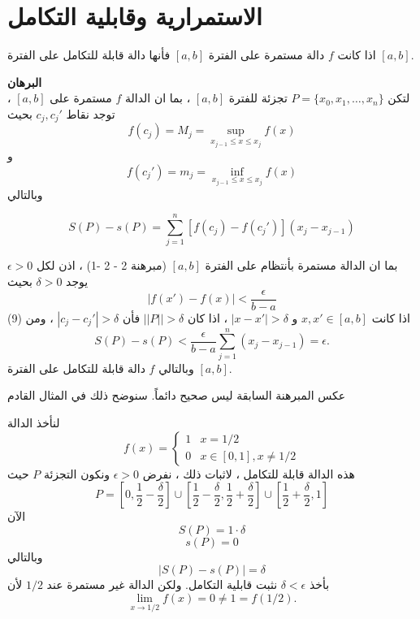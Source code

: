 \section{الاستمرارية وقابلية التكامل \cite{introrealanal}}

\begin{theorem}
	اذا كانت $f$ دالة مستمرة على الفترة $[a, b]$ فأنها دالة قابلة للتكامل على الفترة $[a, b]$.
\end{theorem}
\noindent
\textbf{البرهان}\\
\noindent
لتكن $P = \{ x_0 , x_1, \dots, x_n\}$ تجزئة للفترة $[a, b]$ ، بما ان الدالة $f$ مستمرة على $[a, b]$ ، توجد نقاط $c_j, c_j'$ بحيث
\[
f(c_j) = M_j = \sup_{x_{j-1}\leq x\leq x_j} f(x)
\]
و 
\[
f(c_j') = m_j = \inf_{x_{j-1}\leq x\leq x_j} f(x)
\]
وبالتالي

\begin{equation}
	S(P) - s(P) = \sum_{j=1}^{n} \left[f(c_j) - f(c_j')\right](x_j - x_{j-1})
\end{equation}

بما ان الدالة مستمرة بأنتظام على الفترة $[a, b]$ (مبرهنة 2 - 2 -1) ، اذن لكل $\epsilon > 0 $ يوجد $\delta > 0 $ بحيث
\[
|f(x') - f(x)| < \frac{\epsilon}{b-a}
\]
اذا كانت $x, x'\in [a, b]$ و $|x-x'| > \delta$ ، اذا كان $||P|| > \delta$ فأن $|c_j - c_j'| > \delta$ ، ومن (9) 
\[
S(P) - s(P) < \frac{\epsilon}{b-a} \sum_{j=1}^{n} (x_j - x_{j-1} ) =\epsilon.
\]
وبالتالي $f$ دالة قابلة للتكامل على الفترة $[a, b]$.

\begin{note}
	عكس المبرهنة السابقة ليس صحيح دائماً. سنوضح ذلك في المثال القادم
\end{note}

\begin{example}
	لنأخذ الدالة 
	\[
	f(x) = \begin{cases}
		1 & x=1/2 \\
		0 & x\in [0,1] ,x \neq 1/2
	\end{cases}
	\]
	هذه الدالة قابلة للتكامل ، لاثبات ذلك ، نفرض $\epsilon > 0 $ ونكون التجزئة $P$ حيث
	\[
	P = \left[0, \frac{1}{2} - \frac{\delta}{2} \right] \cup \left[\frac{1}{2} - \frac{\delta}{2}, \frac{1}{2} + \frac{\delta}{2}\right]  \cup \left[\frac{1}{2} + \frac{\delta}{2}, 1\right]
	\]
	الآن
	\[
	S(P ) = 1\cdot \delta
	\]
	\[
	s(P) = 0
	\]
	وبالتالي
	\[
	|S(P) - s(P)| = \delta
	\]
	بأخذ $\delta < \epsilon$ نثبت قابلية التكامل. ولكن الدالة غير مستمرة عند $1/2$ لأن	
\[
\lim\limits_{x\to 1/2} f(x) = 0 \neq 1 = f(1/2). 
\] 
\end{example}
